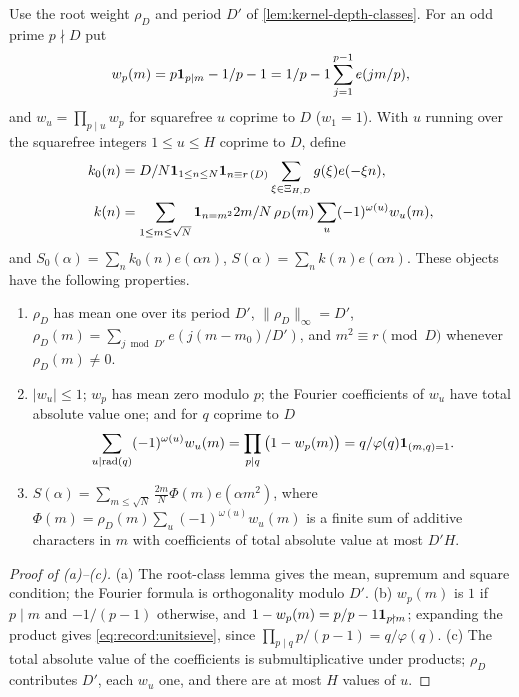 \begin{definition}
\label{def:record:K20-kernels}
Use the root weight $\rho_D$ and period $D'$ of
\cref{lem:kernel-depth-classes}. For an odd prime
$p\nmid D$ put
\[
 w_p(m)=p\mathbf 1_{p\mid m}-1/p-1=1/p-1\sum_{j=1}^{p-1}e(jm/p),
\]
and $w_u=\prod_{p\mid u}w_p$ for squarefree $u$ coprime to $D$ ($w_1=1$).
With $u$ running over the squarefree integers $1\le u\le H$ coprime to $D$,
define
\begin{align*}
 k_0(n)&=D/N\mathbf 1_{1\le n\le N}\mathbf 1_{n\equiv r\,(D)}
  \sum_{\xi\in\Xi_{H,D}}g(\xi)e(-\xi n),\\
 k(n)&=\sum_{1\le m\le\sqrt N}\mathbf 1_{n=m^2}2m/N\,\rho_D(m)
  \sum_u(-1)^{\omega(u)}w_u(m),
\end{align*}
and $S_0(\alpha)=\sum_nk_0(n)e(\alpha n)$, $S(\alpha)=\sum_nk(n)e(\alpha n)$.
These objects have the following properties.
\begin{enumerate}[label=(\alph*)]
\item $\rho_D$ has mean one over its period $D'$, $\|\rho_D\|_\infty=D'$,
 $\rho_D(m)=\sum_{j\bmod D'}e(j(m-m_0)/D')$, and $m^2\equiv r\pmod D$
 whenever $\rho_D(m)\ne0$.
\item $|w_u|\le1$; $w_p$ has mean zero modulo $p$; the Fourier coefficients
 of $w_u$ have total absolute value one; and for $q$ coprime to $D$
 \begin{equation}\label{eq:record:unitsieve}
  \sum_{u\mid\operatorname{rad}(q)}(-1)^{\omega(u)}w_u(m)=\prod_{p\mid q}\big(1-w_p(m)\big)
  =q/\varphi(q)\mathbf 1_{(m,q)=1}.
 \end{equation}
\item $S(\alpha)=\sum_{m\le\sqrt N}\frac{2m}N\Phi(m)e(\alpha m^2)$, where
 $\Phi(m)=\rho_D(m)\sum_u(-1)^{\omega(u)}w_u(m)$ is a finite sum of additive
 characters in $m$ with coefficients of total absolute value at most $D'H$.
\end{enumerate}
\end{definition}

\begin{proof}[Proof of (a)--(c)]
(a) The root-class lemma gives the mean, supremum and square condition;
the Fourier formula is orthogonality modulo $D'$.
(b) $w_p(m)$ is $1$ if $p\mid m$ and $-1/(p-1)$ otherwise, and
$1-w_p(m)=p/p-1\mathbf 1_{p\nmid m}$; expanding the product gives
\eqref{eq:record:unitsieve}, since $\prod_{p\mid q}p/(p-1)=q/\varphi(q)$.
(c) The total absolute value of the coefficients is submultiplicative under
products; $\rho_D$ contributes $D'$, each $w_u$ one, and there are at most $H$
values of $u$.
\end{proof}

